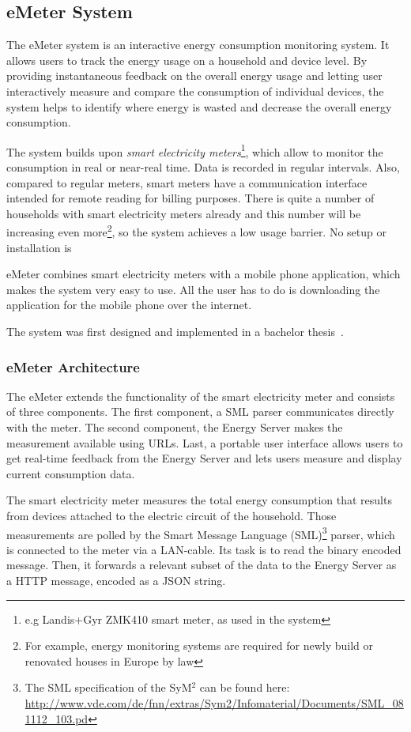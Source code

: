 \subsection{eMeter System}
The eMeter system is an interactive energy consumption monitoring system. It allows users to track the energy usage on a household and device level. By providing instantaneous feedback on the overall energy usage and letting user interactively measure and compare the consumption of individual devices, the system helps to identify where energy is wasted and decrease the overall energy consumption.  

The system builds upon \textit{smart electricity meters}\footnote{e.g Landis+Gyr ZMK410 smart meter, as used in the system}, which allow to monitor the consumption in real or near-real time. Data is recorded in regular intervals. Also, compared to regular meters, smart meters have a communication interface intended for remote reading for billing purposes. There is quite a number of households with smart electricity meters already and this number will be increasing even more\footnote{For example, energy monitoring systems are required for newly build or renovated houses in Europe by law\cite{eu_meter}}, so the system achieves a low usage barrier. No setup or installation is 

eMeter combines smart electricity meters with a mobile phone application, which makes the system very easy to use.  All the user has to do is downloading the application for the mobile phone over the internet.

The system was first designed and implemented in a bachelor thesis~\cite{roediger}. 

\subsubsection{eMeter Architecture}\label{sec:emeter_architecture}
The eMeter extends the functionality of the smart electricity meter and consists of three components. The first component, a SML parser communicates directly with the meter. The second component, the Energy Server makes the measurement available using URLs. Last, a portable user interface allows users to get real-time feedback from the Energy Server and lets users measure and display current consumption data.

The smart electricity meter measures the total energy consumption that results from devices attached to the electric circuit of the household. Those measurements are polled by the Smart Message Language (SML)\footnote{The SML specification of the SyM$^2$ can be found here: \url{http://www.vde.com/de/fnn/extras/Sym2/Infomaterial/Documents/SML_081112_103.pd}} parser, which is connected to the meter via a LAN-cable. Its task is to read the binary encoded message. Then, it  forwards a relevant subset of the data to the Energy Server as a HTTP message, encoded as a JSON string. 


